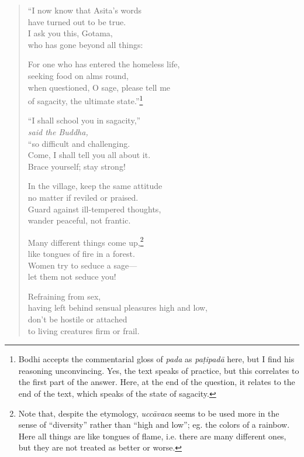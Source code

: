 \documentclass[12pt,openany]{book}%
\newcommand*{\scspeaker}[1]{\hspace{2em}\textit{#1}}
\begin{document}
\begin{verse}%
“I now know that Asita’s words \\
have turned out to be true. \\
I ask you this, Gotama, \\
who has gone beyond all things: 

For one who has entered the homeless life, \\
seeking food on alms round, \\
when questioned, O sage, please tell me \\
of sagacity, the ultimate state.”\footnote{Bodhi accepts the commentarial gloss of \textit{pada} as \textit{\textsanskrit{paṭipadā}} here, but I find his reasoning unconvincing. Yes, the text speaks of practice, but this correlates to the first part of the answer. Here, at the end of the question, it relates to the end of the text, which speaks of the state of sagacity. } 

“I shall school you in sagacity,” \\
\scspeaker{said the Buddha, }\\
“so difficult and challenging. \\
Come, I shall tell you all about it. \\
Brace yourself; stay strong! 

In the village, keep the same attitude \\
no matter if reviled or praised. \\
Guard against ill-tempered thoughts, \\
wander peaceful, not frantic. 

Many different things come up,\footnote{Note that, despite the etymology, \textit{\textsanskrit{uccāvaca}} seems to be used more in the sense of “diversity” rather than “high and low”; eg. the colors of a rainbow. Here all things are like tongues of flame, i.e. there are many different ones, but they are not treated as better or worse. } \\
like tongues of fire in a forest. \\
Women try to seduce a sage—\\
let them not seduce you! 

Refraining from sex, \\
having left behind sensual pleasures high and low, \\
don’t be hostile or attached \\
to living creatures firm or frail. 


\end{verse}
\end{document}
